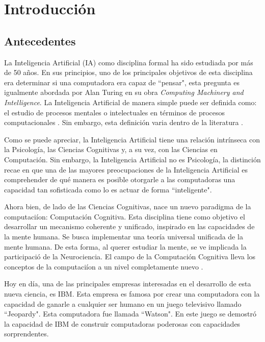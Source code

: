 \chapter{Introducción}
\label{ch:intro}

\section{Antecedentes}

La Inteligencia Artificial (IA) como disciplina formal  ha sido estudiada por más de 50 años. En sus principios, uno de los principales objetivos de esta disciplina era determinar si una computadora era capaz de “pensar", esta pregunta es igualmente abordada por Alan Turing\cite{turing1950computing} en su obra \emph{Computing Machinery and Intelligence}. La Inteligencia Artificial de manera simple puede ser definida como: el estudio de procesos mentales o intelectuales en t\'{e}rminos de procesos computacionales \cite{aimodern}. Sin embargo, esta definici\'{o}n varia dentro de la literatura \cite{haugeland1985,bellman1978,winston1992}. 

Como se puede apreciar, la Inteligencia Artificial tiene una relaci\'{o}n intr\'{i}nseca con la Psicolog\'{i}a, las Ciencias Cognitivas y, a su vez, con las Ciencias en Computaci\'{o}n. Sin embargo, la Inteligencia Artificial no es Psicolog\'{i}a, la distinci\'{o}n recae en que una de las mayores preocupaciones de la Inteligencia Artificial es comprehender de qu\'{e} manera es posible otorgarle a las computadoras una capacidad tan sofisticada como lo es actuar de forma “inteligente".

Ahora bien, de lado de las Ciencias Cognitivas, nace un nuevo paradigma de la computaci\'{i}on: Computaci\'{o}n Cognitiva. Esta disciplina tiene como objetivo el desarrollar un mecanismo coherente y unificado, inspirado en las capacidades de la mente humana. Se busca implementar una teor\'{i}a universal unificada de la mente humana. De esta forma, al querer estudiar la mente, se ve implicada la participaci\'{o} de la Neurociencia. El campo de la Computaci\'{o}n Cognitiva lleva los conceptos de la computaci\'{i}on a un nivel completamente nuevo \cite{cc}.

Hoy en d\'{i}a, una de las principales empresas interesadas en el desarrollo de esta nueva ciencia, es IBM. Esta empresa es famosa por crear una computadora con la capacidad de ganarle a cualquier ser humano en un juego televisivo llamado “Jeopardy". Esta computadora fue llamada “Watson". En este juego se demostr\'{o} la capacidad de IBM de construir computadoras poderosas con capacidades sorprendentes. 

